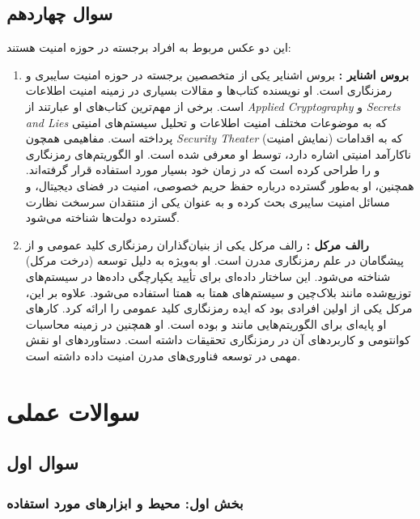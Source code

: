 \documentclass{report}
\begin{document}
\section{سوال چهاردهم}

این دو عکس مربوط به افراد برجسته در حوزه امنیت هستند:
\begin{enumerate}
    \item \textbf{بروس اشنایر :} بروس اشنایر یکی از متخصصین برجسته در حوزه امنیت سایبری و رمزنگاری است. او نویسنده کتاب‌ها و مقالات بسیاری در زمینه امنیت اطلاعات است. برخی از مهم‌ترین کتاب‌های او عبارتند از \textit{Applied Cryptography} و \textit{Secrets and Lies} که به موضوعات مختلف امنیت اطلاعات و تحلیل سیستم‌های امنیتی پرداخته است. مفاهیمی همچون \textit{Security Theater} (نمایش امنیت) که به اقدامات ناکارآمد امنیتی اشاره دارد، توسط او معرفی شده است. او الگوریتم‌های رمزنگاری  و  را طراحی کرده است که در زمان خود بسیار مورد استفاده قرار گرفته‌اند. همچنین، او به‌طور گسترده درباره حفظ حریم خصوصی، امنیت در فضای دیجیتال، و مسائل امنیت سایبری بحث کرده و به عنوان یکی از منتقدان سرسخت نظارت گسترده دولت‌ها شناخته می‌شود.
    
    \item \textbf{رالف مرکل :} رالف مرکل یکی از بنیان‌گذاران رمزنگاری کلید عمومی و از پیشگامان در علم رمزنگاری مدرن است. او به‌ویژه به دلیل توسعه  (درخت مرکل) شناخته می‌شود. این ساختار داده‌ای برای تأیید یکپارچگی داده‌ها در سیستم‌های توزیع‌شده مانند بلاک‌چین و سیستم‌های همتا به همتا استفاده می‌شود. علاوه بر این، مرکل یکی از اولین افرادی بود که ایده رمزنگاری کلید عمومی را ارائه کرد. کارهای او پایه‌ای برای الگوریتم‌هایی مانند  و  بوده است. او همچنین در زمینه محاسبات کوانتومی و کاربردهای آن در رمزنگاری تحقیقات داشته است. دستاوردهای او نقش مهمی در توسعه فناوری‌های مدرن امنیت داده داشته است.
\end{enumerate}

\chapter{سوالات عملی}

\section{سوال اول}

\subsection*{بخش اول: محیط و ابزارهای مورد استفاده}
\end{document}
